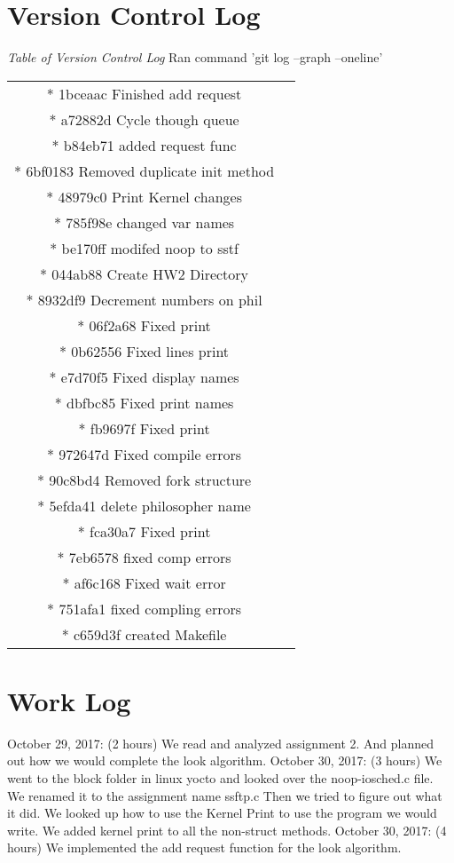 \documentclass{article}
\begin{document}
\section*{Version Control Log}
\textit{Table of Version Control Log} Ran command 'git log --graph --oneline'
\newline
\begin{center}
\begin{tabular}{ c c }
* 1bceaac Finished add request \\
* a72882d Cycle though queue \\
* b84eb71 added request func \\
* 6bf0183 Removed duplicate init method \\
* 48979c0 Print Kernel changes \\
* 785f98e changed var names \\
* be170ff modifed noop to sstf \\
* 044ab88 Create HW2 Directory \\
* 8932df9 Decrement numbers on phil \\
* 06f2a68 Fixed print \\
* 0b62556 Fixed lines print \\
* e7d70f5 Fixed display names \\
* dbfbc85 Fixed print names \\
* fb9697f Fixed print \\
* 972647d Fixed compile errors \\
* 90c8bd4 Removed fork structure \\
* 5efda41 delete philosopher name \\
* fca30a7 Fixed print \\
* 7eb6578 fixed comp errors \\
* af6c168 Fixed wait error \\
* 751afa1 fixed compling errors \\
* c659d3f created Makefile
\end{tabular}
\end{center}

\section*{Work Log}
October 29, 2017: (2 hours) We read and analyzed assignment 2. And planned out how we would complete the look algorithm.
\newline
October 30, 2017: (3 hours) We went to the block folder in linux yocto and looked over the noop-iosched.c file. We renamed it to the assignment name ssftp.c
Then we tried to figure out what it did.
We looked up how to use the Kernel Print to use the program we would write. We added kernel print to all the non-struct methods.
\newline
October 30, 2017: (4 hours) We implemented the add request function for the look algorithm.
\end{document}
